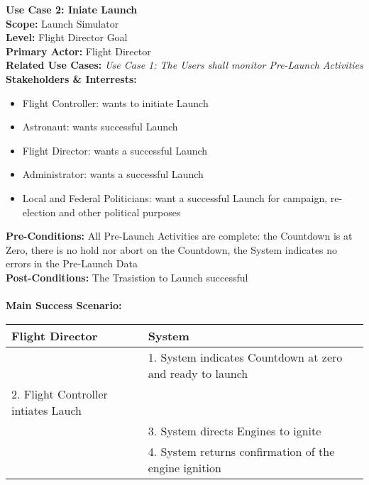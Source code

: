 \documentclass[letterpaper]{article}
\begin{document}
\noindent
\textbf{Use Case 2:  Iniate Launch}\\
\textbf{Scope:  }Launch Simulator\\
\textbf{Level:  }Flight Director Goal\\
\textbf{Primary Actor:  }Flight Director\\
\textbf{Related Use Cases:  }\textit{Use Case 1:  The Users shall
monitor Pre-Launch Activities}\\
\textbf{Stakeholders \& Interrests:  }
\begin{itemize}
\item Flight Controller:  wants to initiate Launch
\item Astronaut:  wants successful Launch
\item Flight Director:  wants a successful Launch
\item Administrator:  wants a successful Launch
\item Local and Federal Politicians:  want a successful Launch for
campaign, re-election and other political purposes
\end{itemize}
\textbf{Pre-Conditions:  }All Pre-Launch Activities are complete:  the
Countdown is at Zero, there is no hold nor abort on the Countdown, the
System indicates no errors in the Pre-Launch Data\\
\textbf{Post-Conditions:  }The Trasistion to Launch successful\\\\
\textbf{Main Success Scenario:  }\\
\begin{tabular}{|p{5.75cm}|p{5.75cm}|}\hline
\textbf{Flight Director} & \textbf{System}\\\hline
& 1. System indicates Countdown at zero and ready to launch\\\hline
2. Flight Controller intiates Lauch & \\\hline
& 3.  System directs Engines to ignite\\\hline
& 4.  System returns confirmation of the engine ignition\\\hline
\end{tabular}
\end{document}
